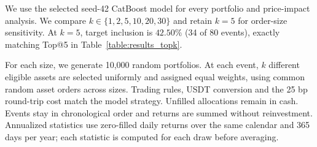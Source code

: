 \documentclass{ieeeaccess}
\begin{document}
\textcolor{revisionblue}{We use the selected seed-42 CatBoost model for every portfolio and price-impact analysis. We compare $k\in\{1,2,5,10,20,30\}$ and retain $k=5$ for order-size sensitivity. At $k=5$, target inclusion is $42.50\%$ (34 of 80 events), exactly matching Top@5 in Table~\ref{table:results_topk}.}

\textcolor{revisionblue}{For each size, we generate 10{,}000 random portfolios. At each event, $k$ different eligible assets are selected uniformly and assigned equal weights, using common random asset orders across sizes. Trading rules, USDT conversion and the 25 bp round-trip cost match the model strategy. Unfilled allocations remain in cash. Events stay in chronological order and returns are summed without reinvestment. Annualized statistics use zero-filled daily returns over the same calendar and 365 days per year; each statistic is computed for each draw before averaging.}
\end{document}
